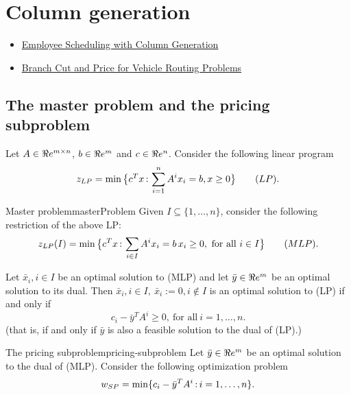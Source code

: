 
\section{Column generation}
\begin{resource}
\begin{itemize}
\item \href{http://yetanothermathprogrammingconsultant.blogspot.com/2017/01/employee-scheduling-ii-column-generation.html}{Employee Scheduling with Column Generation}
\item \href{https://www.math.u-bordeaux.fr/~rsadykov/slides/Sadykov_INOC19slides.pdf}{Branch Cut and Price for Vehicle Routing Problems}
\end{itemize}
\end{resource}
\subsection{The master problem and the pricing subproblem}
Let $A\in\Re e^{m\times n}$, $b\in\Re e^m$ and $c\in\Re e^n$. Consider the following linear program
$$z_{LP}=\min\big\{c^Tx{\,:\,} \sum_{i=1}^nA^ix_i=b, x\geq0\big\}\qquad (LP).$$

\begin{definition}{Master problem}{masterProblem}
Given $I\subseteq \{1,\dots, n\}$,  consider the following restriction of the above LP:
$$z_{LP}(I)=\min\big\{c^Tx{\,:\,} \sum_{i\in I}A^ix_i=b\, x_i\geq0,\ \mbox{for all}\ i\in I\big\}\qquad (MLP).$$
\end{definition}

Let $\bar x_i,i\in I$ be an optimal solution to (MLP) and let $\bar y\in\Re e^m$ be an optimal solution to its dual. Then $\bar x_i,i\in I,\ \bar x_i:=0,i\notin I$ is an optimal solution to (LP) if and only if
$$c_i-\bar y^TA^i\geq 0,\ \text{for all}\ i=1,\dots,n.$$ 
(that is, if and only if $\bar y$ is also a feasible solution to the dual of (LP).)

\begin{definition}{The pricing subproblem}{pricing-subproblem} Let $\bar y\in\Re e^m$ be an optimal solution to the dual of (MLP). Consider the following optimization problem
$$w_{SP}=\min\{c_i-\bar y^TA^i{\,:\,} i=1,\dots, n\}.$$
\end{definition}

